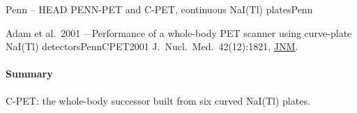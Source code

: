 \begin{programnote}{Penn -- HEAD PENN-PET and C-PET, continuous NaI(Tl) plates}{Penn}
\begin{papernote}{Adam et al.\ 2001 -- Performance of a whole-body PET scanner using curve-plate NaI(Tl) detectors}{PennCPET2001}
J.\ Nucl.\ Med.\ 42(12):1821, \href{https://jnm.snmjournals.org/content/42/12/1821}{JNM}.

\paragraph{Summary}
C-PET: the whole-body successor built from six curved NaI(Tl) plates.

\end{papernote}

\end{programnote}



